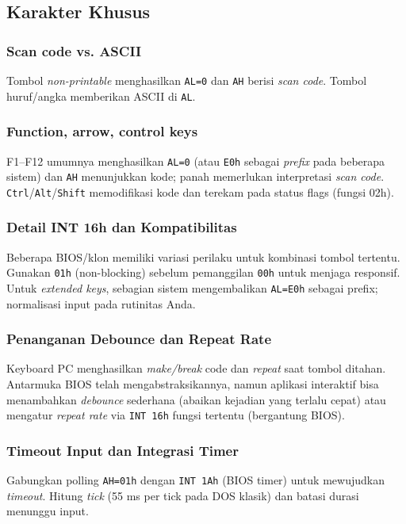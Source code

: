 \subsection{Karakter Khusus}
\subsubsection{Scan code vs. ASCII}
Tombol \textit{non-printable} menghasilkan \texttt{AL=0} dan \texttt{AH} berisi \textit{scan code}. Tombol huruf/angka memberikan ASCII di \texttt{AL}.

\subsubsection{Function, arrow, control keys}
F1--F12 umumnya menghasilkan \texttt{AL=0} (atau \texttt{E0h} sebagai \textit{prefix} pada beberapa sistem) dan \texttt{AH} menunjukkan kode; panah memerlukan interpretasi \textit{scan code}. \texttt{Ctrl}/\texttt{Alt}/\texttt{Shift} memodifikasi kode dan terekam pada status flags (fungsi 02h).

\subsubsection{Detail INT 16h dan Kompatibilitas}
Beberapa BIOS/klon memiliki variasi perilaku untuk kombinasi tombol tertentu. Gunakan \texttt{01h} (non-blocking) sebelum pemanggilan \texttt{00h} untuk menjaga responsif. Untuk \textit{extended keys}, sebagian sistem mengembalikan \texttt{AL=E0h} sebagai prefix; normalisasi input pada rutinitas Anda. \cite{rbil}

\subsubsection{Penanganan Debounce dan Repeat Rate}
Keyboard PC menghasilkan \textit{make/break} code dan \textit{repeat} saat tombol ditahan. Antarmuka BIOS telah mengabstraksikannya, namun aplikasi interaktif bisa menambahkan \textit{debounce} sederhana (abaikan kejadian yang terlalu cepat) atau mengatur \textit{repeat rate} via \texttt{INT 16h} fungsi tertentu (bergantung BIOS). \cite{osdev_wiki}

\subsubsection{Timeout Input dan Integrasi Timer}
Gabungkan polling \texttt{AH=01h} dengan \texttt{INT 1Ah} (BIOS timer) untuk mewujudkan \textit{timeout}. Hitung \textit{tick} (55 ms per tick pada DOS klasik) dan batasi durasi menunggu input. \cite{rbil}

